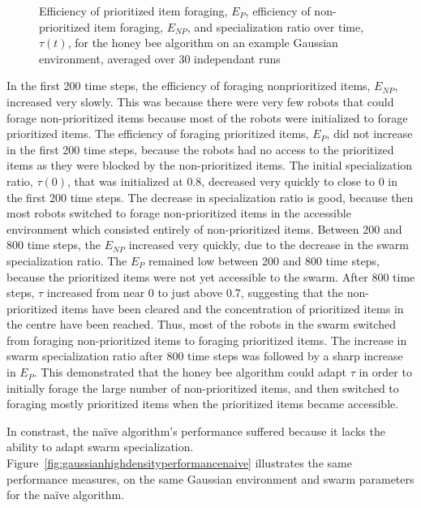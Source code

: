\begin{figure}[!htbp]
\centering
\small
\resizebox{\textwidth}{!}{}
\caption{Efficiency of prioritized item foraging, $E_P$, efficiency of non-prioritized item foraging, $E_{NP}$, and specialization ratio over time, $\tau(t)$, for the honey bee algorithm on an example Gaussian environment, averaged over 30 independant runs}
\label{fig:gaussianhighdensityperformancehoneybee}
\end{figure}

In the first 200 time steps, the efficiency of foraging nonprioritized items, $E_{NP}$, increased very slowly. This was because there were very few robots that could forage non-prioritized items because most of the robots were initialized to forage prioritized items. The efficiency of foraging prioritized items, $E_{P}$, did not increase in the first 200 time steps, because the robots had no access to the prioritized items as they were blocked by the non-prioritized items. The initial specialization ratio, $\tau(0)$, that was initialized at 0.8, decreased very quickly to close to 0 in the first 200 time steps. The decrease in specialization ratio is good, because then most robots switched to forage non-prioritized items in the accessible environment which consisted entirely of non-prioritized items. Between 200 and 800 time steps, the $E_{NP}$ increased very quickly, due to the decrease in the swarm specialization ratio. The $E_{P}$ remained low between 200 and 800 time steps, because the prioritized items were not yet accessible to the swarm. After 800 time steps, $\tau$ increased from near 0 to just above 0.7, suggesting that the non-prioritized items have been cleared and the concentration of prioritized items in the centre have been reached. Thus, most of the robots in the swarm switched from foraging non-prioritized items to foraging prioritized items. The increase in swarm specialization ratio after 800 time steps was followed by a sharp increase in $E_P$. This demonstrated that the honey bee algorithm could adapt $\tau$ in order to initially forage the large number of non-prioritized items, and then switched to foraging mostly prioritized items when the prioritized items became accessible.

In constrast, the na\"ive algorithm's performance suffered because it lacks the ability to adapt swarm specialization. Figure~\ref{fig:gaussianhighdensityperformancenaive} illustrates the same performance measures, on the same Gaussian environment and swarm parameters for the na\"ive algorithm.  

